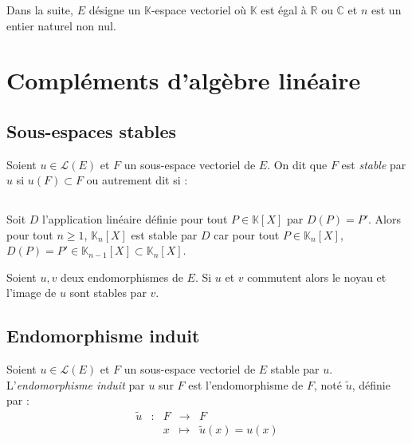 \documentclass[french,11pt,twoside]{VcCours}
\begin{document}

\tableofcontents
\separationTitre

\newpage
Dans la suite, $E$ désigne un $\mathbb{K}$-espace vectoriel où $\mathbb{K}$ est égal à $\mathbb{R}$ ou $\mathbb{C}$ et $n$ est un entier naturel non nul.


\section{Compléments d'algèbre linéaire}
\subsection{Sous-espaces stables}

\begin{Definition}{}
Soient $u \in \mathcal{L}(E)$ et $F$ un sous-espace vectoriel de $E$. 
On dit que $F$ est \emph{stable} par $u$ si $u(F) \subset F$ ou autrement dit si :
$$\phantom{ \forall x \in F, \; u(x) \in F}$$
\end{Definition}

\begin{Exemple}{} Soit $D$ l'application linéaire définie pour tout $P \in \mathbb{K}[X]$ par $D(P)=P'$. Alors pour tout $n \geq 1$, $\mathbb{K}_n[X]$ est stable par $D$ car pour tout $P \in \mathbb{K}_n[X]$, $D(P)=P' \in  \mathbb{K}_{n-1}[X] \subset  \mathbb{K}_n[X]$.
\end{Exemple}



\begin{Proposition}{} Soient $u,v$ deux endomorphismes de $E$. Si $u$ et $v$ commutent alors le noyau et l'image de $u$ sont stables par $v$.
\end{Proposition}

\begin{Demonstration}{}
\vspace{5.5cm}
\end{Demonstration}

\subsection{Endomorphisme induit}

\begin{Definition}{}  Soient $u \in \mathcal{L}(E)$ et $F$ un sous-espace vectoriel de $E$ stable par $u$. L'\emph{endomorphisme induit} par $u$ sur $F$ est l'endomorphisme de $F$, noté $\tilde{u}$, définie par :
$$ \begin{array}{cclll}
\tilde{u} & : & F & \rightarrow & F \\
& & x & \mapsto & \tilde{u}(x)=u(x)\\
\end{array}$$
\end{Definition}
\end{document}
